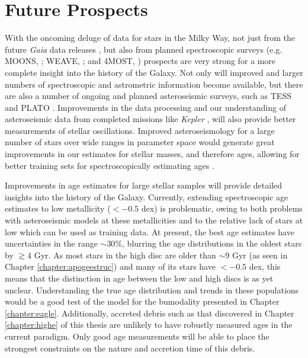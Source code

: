 \section{Future Prospects}

With the oncoming deluge of data for stars in the Milky Way, not just from the future \emph{Gaia} data releases \citep[which will include epoch spectroscopy and photometry, offering the potential to mine the data for element abundances and ages, e.g.][]{2016A&A...595A...1G}, but also from planned spectroscopic surveys (e.g. MOONS, \citeauthor{2012SPIE.8446E..0SC} \citeyear{2012SPIE.8446E..0SC}; WEAVE, \citeauthor{2012SPIE.8446E..0PD} \citeyear{2012SPIE.8446E..0PD}; and 4MOST, \citeauthor{2016SPIE.9908E..1OD} \citeyear{2016SPIE.9908E..1OD}) prospects are very strong for a more complete insight into the history of the Galaxy. Not only will improved and larger numbers of spectroscopic and astrometric information become available, but there are also a number of ongoing and planned asteroseismic surveys, such as TESS \citep{2015JATIS...1a4003R} and PLATO \citep[e.g.][]{2017AN....338..644M}. Improvements in the data processing and our understanding of asteroseismic data from completed missions like \emph{Kepler} \citep{2010Sci...327..977B}, will also provide better measurements of stellar oscillations. Improved asteroseismology for a large number of stars over wide ranges in parameter space would generate great improvements in our estimates for stellar masses, and therefore ages, allowing for better training sets for spectroscopically estimating ages \citep[Such as those in Chapter \ref{chapter:apogeestruc}, from methods like that of e.g.][]{2016MNRAS.456.3655M}. 

Improvements in age estimates for large stellar samples will provide detailed insights into the history of the Galaxy. Currently, extending spectroscopic age estimates to low metallicity (\feh{}$< -0.5$ dex) is problematic, owing to both problems with asteroseismic models at these metallicities \citep[e.g.][]{2014ApJ...785L..28E} and to the relative lack of stars at low \feh{} which can be used as training data. At present, the best age estimates have uncertainties in the range $\sim 30\%$, blurring the age distributions in the oldest stars by $\gtrsim 4$ Gyr. As most stars in the high \afe{} disc are older than $\sim 9$ Gyr (as seen in Chapter \ref{chapter:apogeestruc}) and many of its stars have \feh$< -0.5$ dex, this means that the distinction in age between the low and high \afe{} discs is as yet unclear. Understanding the true age distribution and trends in these populations would be a good test of the model for the \afe{} bumodality presented in Chapter \ref{chapter:eagle}. Additionally, accreted debris such as that discovered in Chapter \ref{chapter:highe} of this thesis are unlikely to have robustly measured ages in the current paradigm. Only good age measurements will be able to place the strongest constraints on the nature and accretion time of this debris. 

